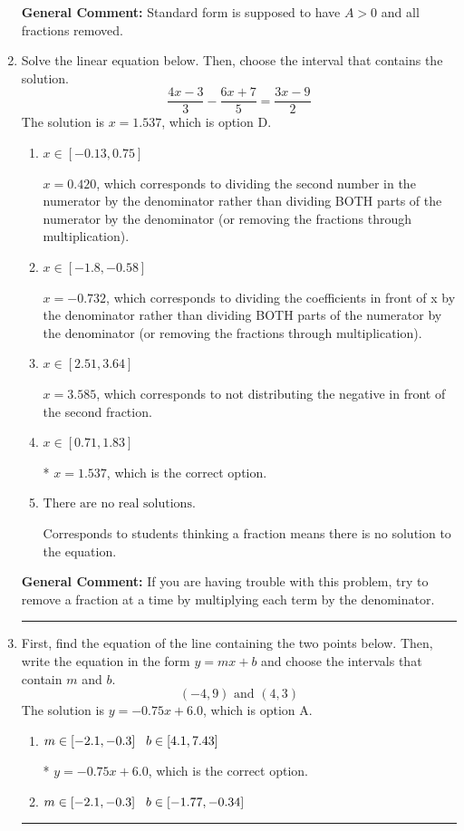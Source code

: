 \documentclass{extbook}[14pt]
\newcommand{\litem}[1]{\item #1

\rule{\textwidth}{0.4pt}}
\begin{document}
\begin{enumerate}
{\textbf{General Comment:} Standard form is supposed to have $A > 0$ and all fractions removed.
}
\litem{
Solve the linear equation below. Then, choose the interval that contains the solution.
\[ \frac{4x -3}{3} - \frac{6x + 7}{5} = \frac{3x -9}{2} \]The solution is \( x = 1.537 \), which is option D.\begin{enumerate}[label=\Alph*.]
\item \( x \in [-0.13, 0.75] \)

 $x = 0.420$, which corresponds to dividing the second number in the numerator by the denominator rather than dividing BOTH parts of the numerator by the denominator (or removing the fractions through multiplication).
\item \( x \in [-1.8, -0.58] \)

 $x = -0.732$, which corresponds to dividing the coefficients in front of x by the denominator rather than dividing BOTH parts of the numerator by the denominator (or removing the fractions through multiplication).
\item \( x \in [2.51, 3.64] \)

 $x = 3.585$, which corresponds to not distributing the negative in front of the second fraction.
\item \( x \in [0.71, 1.83] \)

* $x = 1.537$, which is the correct option.
\item \( \text{There are no real solutions.} \)

Corresponds to students thinking a fraction means there is no solution to the equation.
\end{enumerate}

\textbf{General Comment:} If you are having trouble with this problem, try to remove a fraction at a time by multiplying each term by the denominator.
}
\litem{
First, find the equation of the line containing the two points below. Then, write the equation in the form $ y=mx+b $ and choose the intervals that contain $m$ and $b$.
\[ (-4, 9) \text{ and } (4, 3) \]The solution is \( y = -0.75x + 6.0 \), which is option A.\begin{enumerate}[label=\Alph*.]
\item \( m \in [-2.1, -0.3] \hspace*{3mm} b \in [4.1, 7.43] \)

* $y = -0.75x + 6.0$, which is the correct option.
\item \( m \in [-2.1, -0.3] \hspace*{3mm} b \in [-1.77, -0.34] \)


\end{enumerate}}
\end{enumerate}
\end{document}
